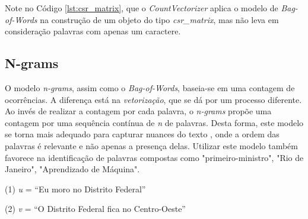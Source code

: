 Note no Código \ref{lst:csr_matrix}, que o \textit{CountVectorizer} aplica o modelo de \textit{Bag-of-Words} na construção de um objeto do tipo \textit{csr\_matrix}, mas não leva em consideração palavras com apenas um caractere.

\subsection{N-grams}

O modelo \textit{n-grams}, assim como o \textit{Bag-of-Words}, baseia-se em uma contagem de ocorrências. A diferença está na \textit{vetorização}, que se dá por um processo diferente. Ao invés de realizar a contagem por cada palavra, o \textit{n-grams} propõe uma contagem por uma sequência contínua de \textit{n} de palavras. Desta forma, este modelo se torna mais adequado para capturar nuances do texto \cite{Lundborg_2017}, onde a ordem das palavras é relevante e não apenas a presença delas. Utilizar este modelo também favorece na identificação de palavras compostas como "primeiro-ministro", "Rio de Janeiro", "Aprendizado de Máquina".

\begin{samepage}
(1) \textit{u} = “Eu moro no Distrito Federal”

\nopagebreak

(2) \textit{v} = “O Distrito Federal fica no Centro-Oeste”
\end{samepage}

